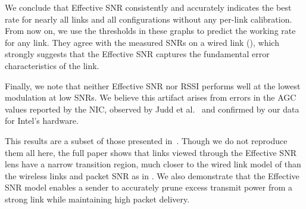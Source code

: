 We conclude that Effective SNR consistently and accurately indicates the best rate for nearly all links and all configurations without any per-link calibration. From now on, we use the thresholds in these graphs to predict the working rate for any link. They agree with the measured SNRs on a wired link (), which strongly suggests that the Effective SNR captures the fundamental error characteristics of the link. 

Finally, we note that neither Effective SNR nor RSSI performs well at the lowest modulation at low SNRs. We believe this artifact arises from errors in the AGC values reported by the NIC, observed by Judd et al.~\cite{Judd_CHARM} and confirmed by our data for Intel's hardware.

 This results are a subset of those presented in~\cite{Halperin_ESNR}. Though we do not reproduce them all here, the full paper shows that links viewed through the Effective SNR lens have a narrow transition region, much closer to the wired link model of  than the wireless links and packet SNR as in . We also demonstrate that the Effective SNR model enables a sender to accurately prune excess transmit power from a strong link while maintaining high packet delivery.

\ifx\mainfile\undefined

\fi
